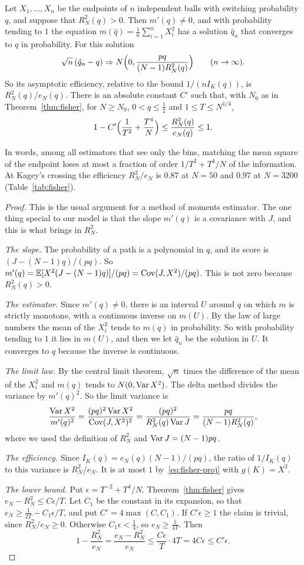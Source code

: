\begin{corollary}\label{cor:fisher-moment}
Let $X_1,\dots,X_n$ be the endpoints of $n$ independent balls with switching
probability $q$, and suppose that $R^2_N(q)>0$. Then $m'(q)\ne0$, and with
probability tending to $1$ the equation
$m(\hat q)=\frac1n\sum_{i=1}^nX_i^2$ has a solution $\hat q_n$ that converges
to $q$ in probability. For this solution
\[
 \sqrt n\,(\hat q_n-q)\Rightarrow N\Bigl(0,\frac{pq}{(N-1)R^2_N(q)}\Bigr)
 \qquad(n\to\infty).
\]
So its asymptotic efficiency, relative to the bound $1/(nI_K(q))$, is
$R^2_N(q)/e_N(q)$. There is an absolute constant $C'$ such that, with $N_0$
as in Theorem~\ref{thm:fisher}, for $N\ge N_0$, $0<q\le\frac12$ and
$1\le T\le N^{1/4}$,
\[
 1-C'\Bigl(\frac1{T^2}+\frac{T^4}N\Bigr)\le\frac{R^2_N(q)}{e_N(q)}\le1 .
\]
\end{corollary}

In words, among all estimators that see only the bins, matching the mean
square of the endpoint loses at most a fraction of order $1/T^2+T^4/N$ of
the information. At Kagey's crossing the efficiency $R^2_N/e_N$ is $0.87$ at
$N=50$ and $0.97$ at $N=3200$ (Table~\ref{tab:fisher}).

\begin{proof}
This is the usual argument for a method of moments estimator. The one thing
special to our model is that the slope $m'(q)$ is a covariance with $J$, and
this is what brings in $R^2_N$.

\emph{The slope.} The probability of a path is a polynomial in $q$, and its
score is $(J-(N-1)q)/(pq)$. So
$m'(q)=\mathbb E[X^2(J-(N-1)q)]/(pq)=\operatorname{Cov}(J,X^2)/(pq)$. This is not zero because
$R^2_N(q)>0$.

\emph{The estimator.} Since $m'(q)\ne0$, there is an interval $U$ around $q$
on which $m$ is strictly monotone, with a continuous inverse on $m(U)$. By the
law of large numbers the mean of the $X_i^2$ tends to $m(q)$ in probability.
So with probability tending to $1$ it lies in $m(U)$, and then we let
$\hat q_n$ be the solution in $U$. It converges to $q$ because the inverse is
continuous.

\emph{The limit law.} By the central limit theorem, $\sqrt n$ times the
difference of the mean of the $X_i^2$ and $m(q)$ tends to $N(0,\operatorname{Var} X^2)$. The
delta method divides the variance by $m'(q)^2$. So the limit variance is
\[
 \frac{\operatorname{Var} X^2}{m'(q)^2}=\frac{(pq)^2\operatorname{Var} X^2}{\operatorname{Cov}(J,X^2)^2}
 =\frac{(pq)^2}{R^2_N(q)\operatorname{Var} J}=\frac{pq}{(N-1)R^2_N(q)} ,
\]
where we used the definition of $R^2_N$ and $\operatorname{Var} J=(N-1)pq$.

\emph{The efficiency.} Since $I_K(q)=e_N(q)(N-1)/(pq)$, the ratio of
$1/I_K(q)$ to this variance is $R^2_N/e_N$. It is at most $1$
by~\eqref{eq:fisher-proj} with $g(K)=X^2$.

\emph{The lower bound.} Put $\epsilon=T^{-2}+T^4/N$. Theorem~\ref{thm:fisher}
gives $e_N-R^2_N\le C\epsilon/T$. Let $C_1$ be the constant in its expansion,
so that $e_N\ge\frac1{2T}-C_1\epsilon/T$, and put $C'=4\max(C,C_1)$. If
$C'\epsilon\ge1$ the claim is trivial, since $R^2_N/e_N\ge0$. Otherwise
$C_1\epsilon<\frac14$, so $e_N\ge\frac1{4T}$. Then
\[
 1-\frac{R^2_N}{e_N}=\frac{e_N-R^2_N}{e_N}\le\frac{C\epsilon}T\cdot4T
 =4C\epsilon\le C'\epsilon .
\]
\end{proof}
